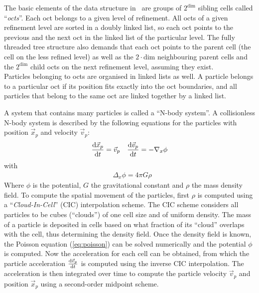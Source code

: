 The basic elements of the data structure in \ramses\ are groups of $2^{\text{dim}}$ sibling cells called ``\emph{octs}''.
Each oct belongs to a given level of refinement. 
All octs of a given refinement level are sorted in a doubly linked list, so each oct points to the previous and the next oct in the linked list of the particular level.
The fully threaded tree structure also demands that each oct points to the parent cell (the cell on the less refined level) as well as the $2 \cdot \text{dim}$ neighbouring parent cells and the $2^{\text{dim}}$ child octs on the next refinement level, assuming they exist. \\
Particles belonging to octs are organised in linked lists as well. 
A particle belongs to a particular oct if its position fits exactly into the oct boundaries, and all particles that belong to the same oct are linked together by a linked list. 

A system that contains many particles is called a ``N-body system''.
A collisionless N-body system is described by the following equations for the particles with position $\vec{x}_p$ and velocity $\vec{v}_p$:
	\begin{align}
		&\frac{\mathrm{d}\vec{x}_p}{\mathrm{d} t} =  \vec{v}_p &\frac{\mathrm{d}\vec{v}_p}{\mathrm{d} t} = - \nabla_x \phi 
	\end{align}
%
with
%
	\begin{align}
		 &\Delta_x \phi = 4 \pi G \rho \label{eq:poisson}
	\end{align}	
%
Where $\phi$ is the potential, $G$ the gravitational constant and $\rho$ the mass density field.
To compute the spatial movement of the particles, first $\rho$ is computed using a ``\emph{Cloud-In-Cell}'' (CIC) interpolation scheme.
The CIC scheme considers all particles to be cubes (``clouds'') of one cell size and of uniform density. 
The mass of a particle is deposited in cells based on what fraction of its ``cloud'' overlaps with the cell, thus determining the density field.
Once the density field is known, the Poisson equation (\ref{eq:poisson}) can be solved numerically and the potential $\phi$ is computed. 
Now the acceleration for each cell can be obtained, from which the particle acceleration $\tfrac {\mathrm{d}\vec{v}_p}{\mathrm{d} t}$ is computed using the inverse CIC interpolation. 
The acceleration is then integrated over time to compute the particle velocity $\vec{v}_p$ and position $\vec{x}_p$ using a second-order midpoint scheme.

